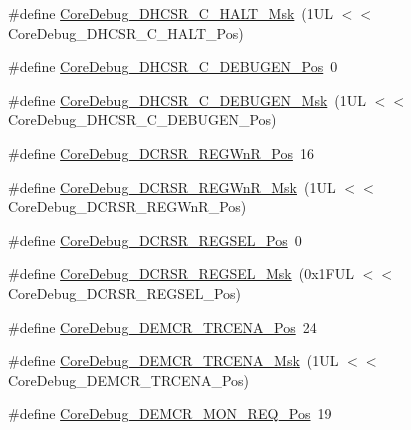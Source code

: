 \begin{DoxyCompactItemize}
\item 
\#define \mbox{\hyperlink{group___c_m_s_i_s___core_debug_ga1d905a3aa594eb2e8bb78bcc4da05b3f}{Core\+Debug\+\_\+\+D\+H\+C\+S\+R\+\_\+\+C\+\_\+\+H\+A\+L\+T\+\_\+\+Msk}}~(1\+U\+L $<$$<$ Core\+Debug\+\_\+\+D\+H\+C\+S\+R\+\_\+\+C\+\_\+\+H\+A\+L\+T\+\_\+\+Pos)
\item 
\#define \mbox{\hyperlink{group___c_m_s_i_s___core_debug_gab557abb5b172b74d2cf44efb9d824e4e}{Core\+Debug\+\_\+\+D\+H\+C\+S\+R\+\_\+\+C\+\_\+\+D\+E\+B\+U\+G\+E\+N\+\_\+\+Pos}}~0
\item 
\#define \mbox{\hyperlink{group___c_m_s_i_s___core_debug_gab815c741a4fc2a61988cd2fb7594210b}{Core\+Debug\+\_\+\+D\+H\+C\+S\+R\+\_\+\+C\+\_\+\+D\+E\+B\+U\+G\+E\+N\+\_\+\+Msk}}~(1\+U\+L $<$$<$ Core\+Debug\+\_\+\+D\+H\+C\+S\+R\+\_\+\+C\+\_\+\+D\+E\+B\+U\+G\+E\+N\+\_\+\+Pos)
\item 
\#define \mbox{\hyperlink{group___c_m_s_i_s___core_debug_ga51e75942fc0614bc9bb2c0e96fcdda9a}{Core\+Debug\+\_\+\+D\+C\+R\+S\+R\+\_\+\+R\+E\+G\+Wn\+R\+\_\+\+Pos}}~16
\item 
\#define \mbox{\hyperlink{group___c_m_s_i_s___core_debug_ga1eef4992d8f84bc6c0dffed1c87f90a5}{Core\+Debug\+\_\+\+D\+C\+R\+S\+R\+\_\+\+R\+E\+G\+Wn\+R\+\_\+\+Msk}}~(1\+U\+L $<$$<$ Core\+Debug\+\_\+\+D\+C\+R\+S\+R\+\_\+\+R\+E\+G\+Wn\+R\+\_\+\+Pos)
\item 
\#define \mbox{\hyperlink{group___c_m_s_i_s___core_debug_ga52182c8a9f63a52470244c0bc2064f7b}{Core\+Debug\+\_\+\+D\+C\+R\+S\+R\+\_\+\+R\+E\+G\+S\+E\+L\+\_\+\+Pos}}~0
\item 
\#define \mbox{\hyperlink{group___c_m_s_i_s___core_debug_ga17cafbd72b55030219ce5609baa7c01d}{Core\+Debug\+\_\+\+D\+C\+R\+S\+R\+\_\+\+R\+E\+G\+S\+E\+L\+\_\+\+Msk}}~(0x1\+F\+U\+L $<$$<$ Core\+Debug\+\_\+\+D\+C\+R\+S\+R\+\_\+\+R\+E\+G\+S\+E\+L\+\_\+\+Pos)
\item 
\#define \mbox{\hyperlink{group___c_m_s_i_s___core_debug_ga6ff2102b98f86540224819a1b767ba39}{Core\+Debug\+\_\+\+D\+E\+M\+C\+R\+\_\+\+T\+R\+C\+E\+N\+A\+\_\+\+Pos}}~24
\item 
\#define \mbox{\hyperlink{group___c_m_s_i_s___core_debug_ga5e99652c1df93b441257389f49407834}{Core\+Debug\+\_\+\+D\+E\+M\+C\+R\+\_\+\+T\+R\+C\+E\+N\+A\+\_\+\+Msk}}~(1\+U\+L $<$$<$ Core\+Debug\+\_\+\+D\+E\+M\+C\+R\+\_\+\+T\+R\+C\+E\+N\+A\+\_\+\+Pos)
\item 
\#define \mbox{\hyperlink{group___c_m_s_i_s___core_debug_ga341020a3b7450416d72544eaf8e57a64}{Core\+Debug\+\_\+\+D\+E\+M\+C\+R\+\_\+\+M\+O\+N\+\_\+\+R\+E\+Q\+\_\+\+Pos}}~19
\item 
$$
\end{DoxyCompactItemize}
